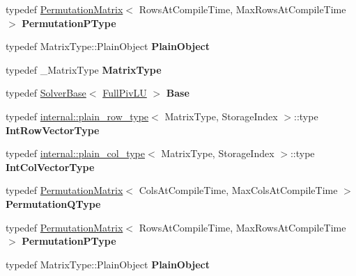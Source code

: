 \begin{DoxyCompactItemize}
typedef \hyperlink{group___core___module_class_eigen_1_1_permutation_matrix}{Permutation\+Matrix}$<$ Rows\+At\+Compile\+Time, Max\+Rows\+At\+Compile\+Time $>$ {\bfseries Permutation\+P\+Type}
\item 
\mbox{\label{group___l_u___module_a2e642045d79065fed9a4308e762960dd}} 
typedef Matrix\+Type\+::\+Plain\+Object {\bfseries Plain\+Object}
\item 
\mbox{\label{group___l_u___module_a1a547b7b88b78d66a86d58e7250e71cd}} 
typedef \+\_\+\+Matrix\+Type {\bfseries Matrix\+Type}
\item 
\mbox{\label{group___l_u___module_a7dbfc3b86bdc6ac0353f6822aaf6e83d}} 
typedef \hyperlink{class_eigen_1_1_solver_base}{Solver\+Base}$<$ \hyperlink{group___l_u___module_class_eigen_1_1_full_piv_l_u}{Full\+Piv\+LU} $>$ {\bfseries Base}
\item 
\mbox{\label{group___l_u___module_a5d9f1e67b690ba1e644459beea9dfbd4}} 
typedef \hyperlink{struct_eigen_1_1internal_1_1plain__row__type}{internal\+::plain\+\_\+row\+\_\+type}$<$ Matrix\+Type, Storage\+Index $>$\+::type {\bfseries Int\+Row\+Vector\+Type}
\item 
\mbox{\label{group___l_u___module_a458b3a9507557e466256e1de43472981}} 
typedef \hyperlink{struct_eigen_1_1internal_1_1plain__col__type}{internal\+::plain\+\_\+col\+\_\+type}$<$ Matrix\+Type, Storage\+Index $>$\+::type {\bfseries Int\+Col\+Vector\+Type}
\item 
\mbox{\label{group___l_u___module_a9fd5533ea778e72590b05c8b00e6b430}} 
typedef \hyperlink{group___core___module_class_eigen_1_1_permutation_matrix}{Permutation\+Matrix}$<$ Cols\+At\+Compile\+Time, Max\+Cols\+At\+Compile\+Time $>$ {\bfseries Permutation\+Q\+Type}
\item 
\mbox{\label{group___l_u___module_ab2b1221f54f6403e9f9d96e12ee50fac}} 
typedef \hyperlink{group___core___module_class_eigen_1_1_permutation_matrix}{Permutation\+Matrix}$<$ Rows\+At\+Compile\+Time, Max\+Rows\+At\+Compile\+Time $>$ {\bfseries Permutation\+P\+Type}
\item 
\mbox{\label{group___l_u___module_a2e642045d79065fed9a4308e762960dd}} 
typedef Matrix\+Type\+::\+Plain\+Object {\bfseries Plain\+Object}
\end{DoxyCompactItemize}
